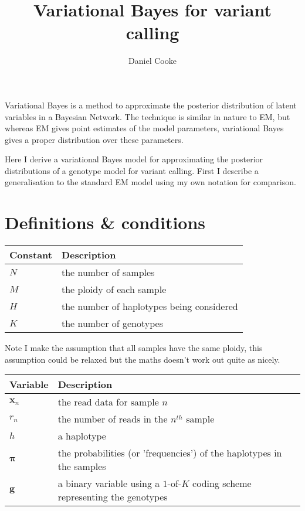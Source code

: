 \documentclass{article}
\title{Variational Bayes for variant calling}
\author{Daniel Cooke}
\date{}
\begin{document}
\maketitle

Variational Bayes is a method to approximate the posterior distribution of latent variables in a Bayesian Network. The technique is similar in nature to EM, but whereas EM gives point estimates of the model parameters, variational Bayes gives a proper distribution over these parameters.

Here I derive a variational Bayes model for approximating the posterior distributions of a genotype model for variant calling. First I describe a generalisation to the standard EM model using my own notation for comparison.

\section{Definitions \& conditions}

\begin{center}
\begin{tabular}{ll}
Constant & Description \\
\hline
$N$ & the number of samples \\
$M$ & the ploidy of each sample \\
$H$ & the number of haplotypes being considered \\
$K$ & the number of genotypes \\
\hline
\end{tabular}
\end{center}

Note I make the assumption that all samples have the same ploidy, this assumption could be relaxed but the maths doesn't work out quite as nicely.

\begin{center}
\begin{tabular}{ll}
Variable & Description \\
\hline
$\boldsymbol{x}_n$ & the read data for sample $n$ \\
$r_n$ & the number of reads in the $n^{th}$ sample \\
$h$ & a haplotype \\
$\boldsymbol{\pi}$ & the probabilities (or 'frequencies') of the haplotypes in the samples \\
$\boldsymbol{g}$ & a binary variable using a $1$-of-$K$ coding scheme representing the genotypes \\
\hline
\end{tabular}
\end{center}
\end{document}
